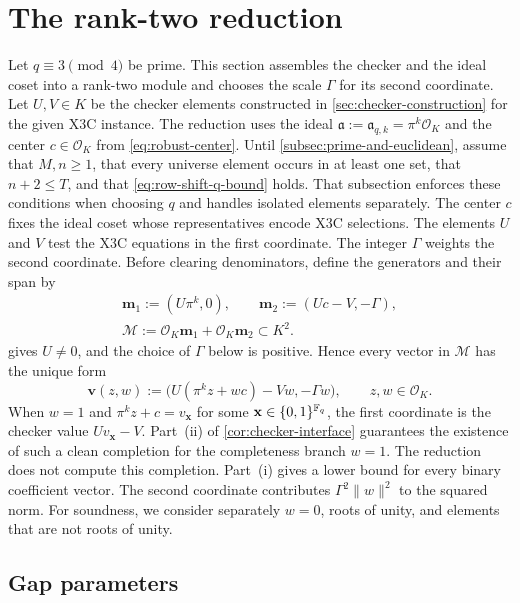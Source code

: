 \section{The rank-two reduction}
\label{sec:reduction}

Let $q\equiv3\pmod4$ be prime.  This section assembles the checker
and the ideal coset into a rank-two module and chooses the scale $\Gamma$ for
its second coordinate.  Let $U,V\in K$ be the checker elements constructed in
\cref{sec:checker-construction} for the given X3C instance.  The reduction uses the ideal
$\mathfrak a:=\mathfrak a_{q,k}=\pi^k\mathcal{O}_K$ and the center
$c\in\mathcal{O}_K$ from \cref{eq:robust-center}.
Until \cref{subsec:prime-and-euclidean}, assume that $M,n\ge1$,
that every universe element occurs in at least one set, that $n+2\le T$, and
that \cref{eq:row-shift-q-bound} holds.  That subsection enforces these
conditions when choosing $q$ and handles isolated elements separately.
The center $c$ fixes the ideal coset whose representatives encode
X3C selections.  The elements $U$ and $V$ test the X3C equations in the first
coordinate.  The integer $\Gamma$ weights the second coordinate.
Before clearing denominators, define the generators and their span by
\begin{gather*}
 \mathbf m_1:=(U\pi^k,0),
 \qquad
 \mathbf m_2:=(Uc-V,-\Gamma),
 \\
 \mathcal M:=\mathcal{O}_K\mathbf m_1
 +\mathcal{O}_K\mathbf m_2\subset K^2.
\end{gather*}
 gives $U\ne0$, and the choice of
$\Gamma$ below is positive.  Hence every vector in $\mathcal M$ has the unique
form
\begin{equation}
\label{eq:module-vector-exact}
 \mathbf v(z,w)
 :=\bigl(U(\pi^kz+wc)-Vw,-\Gamma w\bigr),
 \qquad z,w\in\mathcal{O}_K.
\end{equation}
When $w=1$ and $\pi^kz+c=v_{\mathbf x}$ for some
$\mathbf x\in\{0,1\}^{\mathbb F_q}$, the first coordinate is the checker value
 $Uv_{\mathbf x}-V$.  Part~(ii) of
 \cref{cor:checker-interface} guarantees the existence of such a clean
 completion for the completeness branch $w=1$.  The reduction does not compute this
 completion.  Part~(i) gives a lower bound for every binary coefficient
 vector.  The second coordinate contributes
$\Gamma^2\|w\|^2$ to the squared norm.  For soundness, we consider separately
$w=0$, roots of unity, and elements that are not roots of unity.

\subsection{Gap parameters}

